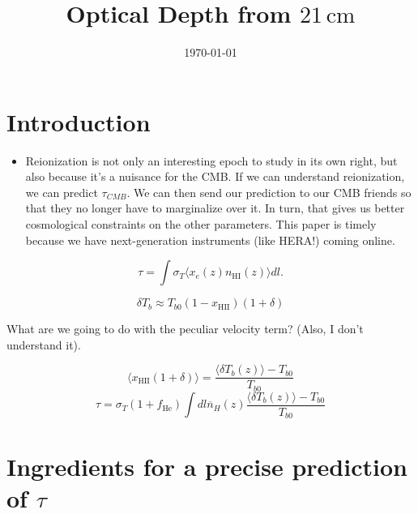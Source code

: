 \documentclass[twocolumn,aps,prd,nofootinbib,showpacs]{revtex4-1}
\begin{document}
\title{Optical Depth from $21\,\textrm{cm}$}


\date{\today}





\begin{abstract}

\end{abstract}

\maketitle

\section{Introduction}
\begin{itemize}
\item Reionization is not only an interesting epoch to study in its own right, but also because it's a nuisance for the CMB.  If we can understand reionization, we can predict $\tau_{CMB}$.  We can then send our prediction to our CMB friends so that they no longer have to marginalize over it.  In turn, that gives us better cosmological constraints on the other parameters.  This paper is timely because we have next-generation instruments (like HERA!) coming online.
\end{itemize}

\begin{equation}
\tau = \int  \sigma_T \langle x_e (z) n_\textrm{HI} (z) \rangle dl.
\end{equation}

\begin{equation}
\delta T_{b} \approx T_{b0} ( 1 - x_\textrm{HII} ) (1 + \delta)
\end{equation}

What are we going to do with the peculiar velocity term? (Also, I don't understand it).

\begin{equation}
\langle x_\textrm{HII} ( 1 + \delta) \rangle = \frac{\langle \delta T_b (z) \rangle - T_{b0}}{T_{b0}}
\end{equation}
\begin{equation}
\tau = \sigma_T (1 + f_\textrm{He}) \int dl \overline{n}_H (z) \frac{\langle \delta T_b (z) \rangle - T_{b0}}{T_{b0}}
\end{equation}

\section{Ingredients for a precise prediction of $\tau$ }
\end{document}
